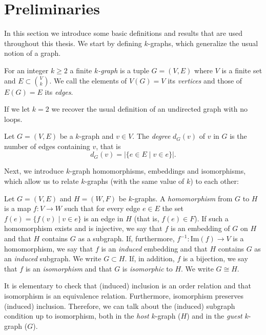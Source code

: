 \section{Preliminaries}\label{sec:preliminaries}
In this section we introduce some basic definitions and results that are used throughout this thesis.
We start by defining $k$-graphs, which generalize the usual notion of a graph.

\begin{definition}

    For an integer $k \geq 2$ a finite \emph{$k$-graph}
    is a tuple $G = (V, E)$ where $V$ is a finite set
    and $E \subset \binom{V}{k}$.
    We call the elements of $V(G) = V$ its \emph{vertices}
    and those of $E(G) = E$ its \emph{edges}.
\end{definition}

\begin{remark}
    If we let $k=2$ we recover the usual definition of an undirected graph with no loops.
\end{remark}

\begin{definition}
    Let $G = (V, E)$ be a $k$-graph and $v \in V$.
    The \emph{degree} $d_G(v)$ of $v$ in $G$
    is the number of edges containing $v$, that is
    \[
        d_G(v) = |\{e \in E \mid v \in e\}|.
    \]
\end{definition}

Next, we introduce $k$-graph homomorphisms, embeddings and isomorphisms, which allow us
to relate $k$-graphs (with the same value of $k$) to each other:

\begin{definition}
    Let $G = (V, E)$ and $H = (W, F)$ be $k$-graphs.
    A \emph{homomorphism} from $G$ to $H$ is a map $f: V \to W$
    such that for every edge $e \in E$ the set $f(e) = \{f(v) \mid v \in e\}$
    is an edge in $H$ (that is, $f(e) \in F$). If such a homomorphism exists
    and is injective, we say that $f$ is an embedding of $G$ on $H$
    and that $H$ contains $G$ as a subgraph.
    If, furthermore, $f^{-1}: \text{Im}(f) \to V$ is a homomorphism, we say that $f$
    is an \emph{induced} embedding and that $H$ contains $G$ as an \emph{induced}
    subgraph.
    We write $G \subset H$.
    If, in addition, $f$ is a bijection, we say that $f$ is an \emph{isomorphism}
    and that $G$ is \emph{isomorphic} to $H$.
    We write $G \cong H$.
\end{definition}

It is elementary to check that
(induced) inclusion is an order relation and that
isomorphism is an equivalence relation.
Furthermore, isomorphism preserves (induced) inclusion.
Therefore, we can talk about the (induced) subgraph
condition up to isomorphism, both in the \emph{host} $k$-graph
($H$) and in the \emph{guest} $k$-graph ($G$).

